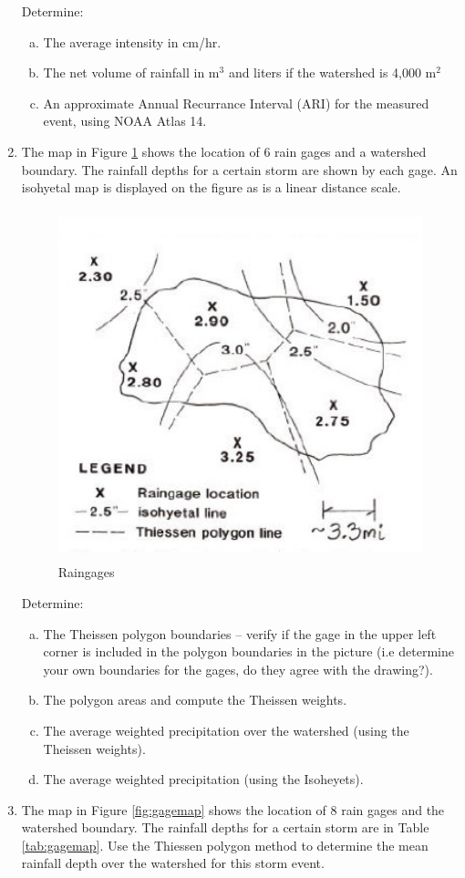 \documentclass[12pt]{article}
\begin{document}
\begin{enumerate}
Determine:
    \begin{enumerate}[a)]
        \item The average intensity in cm/hr.
        \item The net volume of rainfall in m$^3$ and liters if the watershed is 4,000 m$^2$
        \item An approximate Annual Recurrance Interval (ARI) for the measured event, using NOAA Atlas 14. 
    \end{enumerate}
\clearpage
\item The map in Figure \ref{fig:polygonmap} shows the location of 6 rain gages and a watershed boundary. The rainfall depths for a certain storm are shown by each gage. An isohyetal map is displayed on the figure as is a linear distance scale.

\begin{figure}[h!] %
   \centering
   \includegraphics[height=4in]{polygonmap.png} 
   \caption{Raingages}
   \label{fig:polygonmap}
\end{figure}

Determine:
    \begin{enumerate}[a)]
        \item The Theissen polygon boundaries – verify if the gage in the upper left corner is included in the polygon boundaries in the picture (i.e determine your own boundaries for the gages, do they agree with the drawing?). 
        \item The polygon areas and compute the Theissen weights.
        \item The average weighted precipitation over the watershed (using the Theissen weights).
        \item The average weighted precipitation (using the Isoheyets).
    \end{enumerate}
\clearpage
\item The map in Figure \ref{fig:gagemap} shows the location of 8 rain gages and the watershed boundary. The rainfall depths for a certain storm are in Table \ref{tab:gagemap}. Use the Thiessen polygon method to determine the mean rainfall depth over the watershed for this storm event.


\end{enumerate}
\end{document}
